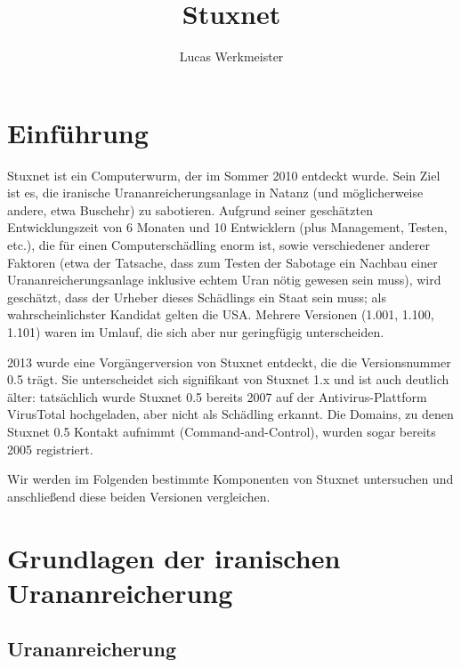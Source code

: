 \documentclass[a4paper]{article}
\title{Stuxnet}
\author{Lucas Werkmeister}
\begin{document}
\maketitle


\section{Einführung}

Stuxnet ist ein Computerwurm, der im Sommer 2010 entdeckt wurde.
Sein Ziel ist es, die iranische Urananreicherungsanlage in Natanz (und möglicherweise andere, etwa Buschehr) zu sabotieren.
Aufgrund seiner geschätzten Entwicklungszeit von 6 Monaten und 10 Entwicklern (plus Management, Testen, etc.),
die für einen Computerschädling enorm ist, sowie verschiedener anderer Faktoren
(etwa der Tatsache, dass zum Testen der Sabotage ein Nachbau einer Urananreicherungsanlage inklusive echtem Uran nötig gewesen sein muss),
wird geschätzt, dass der Urheber dieses Schädlings ein Staat sein muss;
als wahrscheinlichster Kandidat gelten die USA.
Mehrere Versionen (1.001, 1.100, 1.101) waren im Umlauf, die sich aber nur geringfügig unterscheiden.

2013 wurde eine Vorgängerversion von Stuxnet entdeckt, die die Versionsnummer 0.5 trägt.
Sie unterscheidet sich signifikant von Stuxnet 1.x und ist auch deutlich älter:
tatsächlich wurde Stuxnet 0.5 bereits 2007 auf der Antivirus-Plattform VirusTotal hochgeladen, aber nicht als Schädling erkannt.
Die Domains, zu denen Stuxnet 0.5 Kontakt aufnimmt (Command-and-Control), wurden sogar bereits 2005 registriert.

Wir werden im Folgenden bestimmte Komponenten von Stuxnet untersuchen und anschließend diese beiden Versionen vergleichen.

\section{Grundlagen der iranischen Urananreicherung}

\subsection{Urananreicherung}
\end{document}
